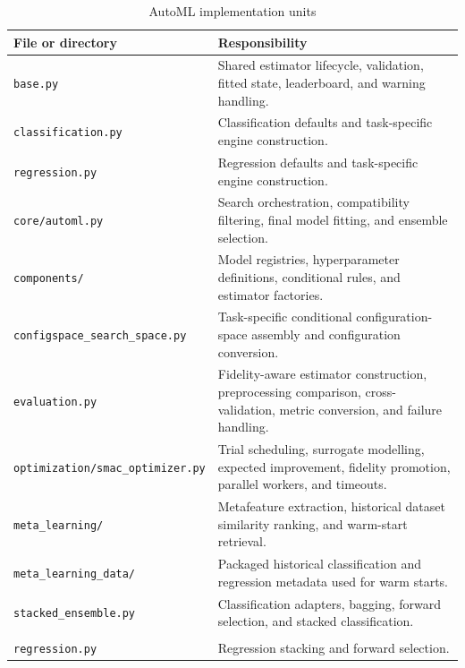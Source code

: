 \documentclass[12pt,a4paper]{report}
\newcommand{\acceleraTableStyle}{%
\small
\renewcommand{\arraystretch}{1.15}
\setlength{\tabcolsep}{4pt}%
}
\newcommand{\modulepath}[1]{\texttt{#1}}
\begin{document}
\begin{table}[H]
\centering
\acceleraTableStyle
\caption{AutoML implementation units}
\label{tab:automl_implementation_units}
\small
\begin{tabularx}{\textwidth}{>{\raggedright\arraybackslash}p{}X}
\toprule
\textbf{File or directory} & \textbf{Responsibility} \\
\midrule
\modulepath{base.py} & Shared estimator lifecycle, validation, fitted state,
leaderboard, and warning handling. \\
\midrule
\modulepath{classification.py} & Classification defaults and task-specific engine
construction. \\
\midrule
\modulepath{regression.py} & Regression defaults and task-specific engine
construction. \\
\midrule
\modulepath{core/automl.py} & Search orchestration, compatibility filtering,
final model fitting, and ensemble selection. \\
\midrule
\modulepath{components/} & Model registries, hyperparameter definitions,
conditional rules, and estimator factories. \\
\midrule
\modulepath{configspace\_search\_space.py} & Task-specific conditional
configuration-space assembly and configuration conversion. \\
\midrule
\modulepath{evaluation.py} & Fidelity-aware estimator construction,
preprocessing comparison, cross-validation, metric conversion, and failure
handling. \\
\midrule
\modulepath{optimization/smac\_optimizer.py} & Trial scheduling, surrogate
modelling, expected improvement, fidelity promotion, parallel workers, and
timeouts. \\
\midrule
\modulepath{meta\_learning/} & Metafeature extraction, historical dataset
similarity ranking, and warm-start retrieval. \\
\midrule
\modulepath{meta\_learning\_data/} & Packaged historical classification and
regression metadata used for warm starts. \\
\midrule
\modulepath{stacked\_ensemble.py} & Classification adapters, bagging,
forward selection, and stacked classification. \\
\midrule
\begin{tabular}[t]{@{}l@{}}\modulepath{stacked\_ensemble\_}\\\modulepath{regression.py}\end{tabular} & Regression stacking and
forward selection. \\
\bottomrule
\end{tabularx}
\end{table}
\end{document}
